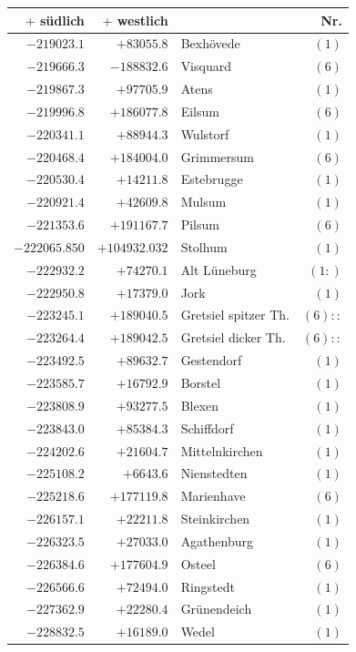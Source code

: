 \begin{center}\begingroup\fontsize{8}{9}\selectfont
\setlength{\tabcolsep}{4pt}
\begin{tabular}{r|r|p{170pt}|r}\hline
\(+\) südlich&\(+\) westlich&&Nr.\\\hline
\(-219023.1\)&\(+83055.8\)&Bexhövede&\((1)\)\\
\(-219666.3\)&\(-188832.6\)&Visquard&\((6)\)\\
\(-219867.3\)&\(+97705.9\)&Atens&\((1)\)\\
\(-219996.8\)&\(+186077.8\)&Eilsum&\((6)\)\\
\(-220341.1\)&\(+88944.3\)&Wulstorf&\((1)\)\\
\(-220468.4\)&\(+184004.0\)&Grimmersum&\((6)\)\\
\(-220530.4\)&\(+14211.8\)&Estebrugge&\((1)\)\\
\(-220921.4\)&\(+42609.8\)&Mulsum&\((1)\)\\
\(-221353.6\)&\(+191167.7\)&Pilsum&\((6)\)\\
\(-222065.850\)&\(+104932.032\)&Stolhum&\((1)\)\\
\(-222932.2\)&\(+74270.1\)&Alt Lüneburg&\((1:)\)\\
\(-222950.8\)&\(+17379.0\)&Jork&\((1)\)\\
\(-223245.1\)&\(+189040.5\)&Gretsiel spitzer Th.&\((6)::\)\\
\(-223264.4\)&\(+189042.5\)&Gretsiel dicker Th.&\((6)::\)\\
\(-223492.5\)&\(+89632.7\)&Gestendorf&\((1)\)\\
\(-223585.7\)&\(+16792.9\)&Borstel&\((1)\)\\
\(-223808.9\)&\(+93277.5\)&Blexen&\((1)\)\\
\(-223843.0\)&\(+85384.3\)&Schiffdorf&\((1)\)\\
\(-224202.6\)&\(+21604.7\)&Mittelnkirchen&\((1)\)\\
\(-225108.2\)&\(+6643.6\)&Nienstedten&\((1)\)\\
\(-225218.6\)&\(+177119.8\)&Marienhave&\((6)\)\\
\(-226157.1\)&\(+22211.8\)&Steinkirchen&\((1)\)\\
\(-226323.5\)&\(+27033.0\)&Agathenburg&\((1)\)\\
\(-226384.6\)&\(+177604.9\)&Osteel&\((6)\)\\
\(-226566.6\)&\(+72494.0\)&Ringstedt&\((1)\)\\
\(-227362.9\)&\(+22280.4\)&Grünendeich&\((1)\)\\
\(-228832.5\)&\(+16189.0\)&Wedel&\((1)\)\\

\end{tabular}
\end{center}
